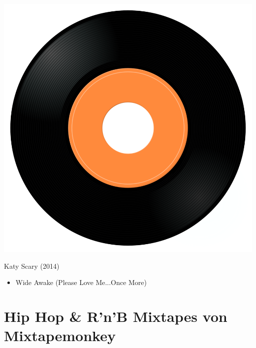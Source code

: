 \begin{minipage}[t]{0.25\textwidth}\vspace{0pt}
	\captionsetup{type=figure}
	\includegraphics[width=\textwidth]{Images/cover.png}
	\caption*{Katy Scary (2014)}
\end{minipage}
\begin{minipage}[t]{0.25\textwidth}\vspace{0pt}
	\begin{itemize}[nosep,leftmargin=1em,labelwidth=*,align=left]
		\setlength{\itemsep}{0pt}
		\item Wide Awake (Please Love Me...Once More)
	\end{itemize}
\end{minipage}


\section{Hip Hop \& R'n'B Mixtapes von Mixtapemonkey}

